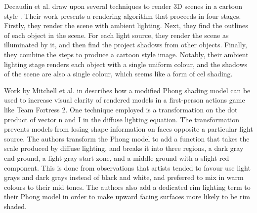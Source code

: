 Decaudin et al. draw upon several techniques to render 3D scenes in a cartoon style 
\cite{decaudin96}. Their work presents a rendering algorithm that proceeds in four stages. 
Firstly, they render the scene with ambient lighting. Next, they find the outlines of each 
object in the scene. For each light source, they render the scene as illuminated by it, and 
then find the project shadows from other objects. Finally, they combine the steps to produce 
a cartoon style image. Notably, their ambient lighting stage renders each object with a 
single uniform colour, and the shadows of the scene are also a single colour, which seems 
like a form of cel shading.

\cite{gooch98}
Work by Mitchell et al. in \cite{mitchell07} describes how a modified Phong shading model can
be used to increase visual clarity of rendered models in a first-person actions game like Team
Fortress 2. One technique employed is a transformation on the dot product of vector n and I in 
the diffuse lighting equation. The transformation prevents models from losing shape information
on faces opposite a particular light source. The authors transform the Phong model
to add a function that takes the scale produced by diffuse lighting, and breaks it into three 
regions, a dark gray end ground, a light gray start zone, and a middle ground with a slight 
red component. This is done from observations that artists tended to favour use light grays and
dark grays instead of black and white, and preferred to mix in warm colours to their mid tones. 
The authors also add a dedicated rim lighting term to their Phong model in order to make upward
facing surfaces more likely to be rim shaded.
